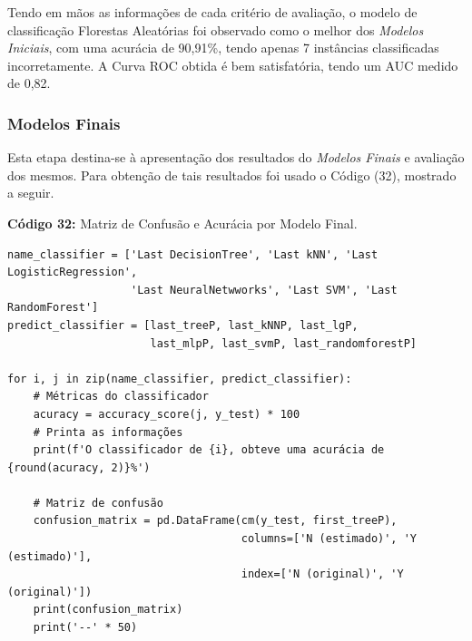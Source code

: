 \documentclass[a4paper,12pt]{article} %
\begin{document}
Tendo em mãos as informações de cada critério de avaliação, o modelo de classificação Florestas Aleatórias foi observado como o melhor dos \textit{Modelos Iniciais}, com uma acurácia de 90,91\%, tendo apenas 7 instâncias classificadas incorretamente. A Curva ROC obtida é bem satisfatória, tendo um AUC medido de 0,82.

\subsubsection{Modelos Finais}
Esta etapa destina-se à apresentação dos resultados do \textit{Modelos Finais} e avaliação dos mesmos. Para obtenção de tais resultados foi usado o Código (32), mostrado  a seguir.
\begin{center}
\textbf{Código 32:} Matriz de Confusão e Acurácia por Modelo Final.
\begin{verbatim}
name_classifier = ['Last DecisionTree', 'Last kNN', 'Last LogisticRegression',
                   'Last NeuralNetwworks', 'Last SVM', 'Last RandomForest']
predict_classifier = [last_treeP, last_kNNP, last_lgP,
                      last_mlpP, last_svmP, last_randomforestP]

for i, j in zip(name_classifier, predict_classifier):
    # Métricas do classificador
    acuracy = accuracy_score(j, y_test) * 100
    # Printa as informações
    print(f'O classificador de {i}, obteve uma acurácia de {round(acuracy, 2)}%')

    # Matriz de confusão
    confusion_matrix = pd.DataFrame(cm(y_test, first_treeP),
                                    columns=['N (estimado)', 'Y (estimado)'],
                                    index=['N (original)', 'Y (original)'])
    print(confusion_matrix)
    print('--' * 50)
\end{verbatim}
\end{center}
\end{document}

